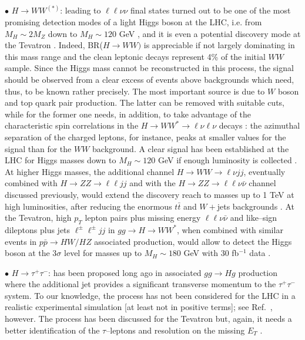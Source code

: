 $\bullet$ \underline{$H \to WW^{(*)}$}: leading to $ \ell \ell \nu \nu$ final
states turned out to be one of the most promising detection modes of a light
Higgs boson at the LHC, i.e. from $M_H \sim 2M_Z$ down to $M_H \sim 120$ GeV
\cite{pp-HWW-lnln,pp-HWW-lnln2}, and it is even a potential discovery mode at 
the Tevatron \cite{pp-WW-TeV}. Indeed, BR($H \to WW)$ is appreciable if not 
largely dominating in this mass range and the clean leptonic decays represent 
4\% of the initial $WW$ sample. Since the Higgs mass cannot be reconstructed in
this process, the signal should be observed from a clear excess of events above
backgrounds which need, thus, to be known rather precisely. The most important
source is due to $W$ boson \cite{pp-bkg-WW} and top quark \cite{pp-bkg-tt} pair
production. The latter can be removed with suitable cuts, while for the former
one needs, in addition, to take advantage of the characteristic spin
correlations in the $H \to WW^* \to \ell \nu \ell \nu$ decays
\cite{CPHVVpol,pp-HWW-lnln}: the azimuthal separation of the charged
leptons, for instance, peaks at smaller values for the signal than for the $WW$
background.  A clear signal has been established at the LHC for Higgs masses 
down to $M_H \sim 120$ GeV if enough luminosity is collected
\cite{pp-HWW-lnln,pp-HWW-lnln2}.  At higher Higgs masses, the additional channel
$H\to WW\to \ell\nu jj$, eventually combined with $H\to ZZ\to \ell\ell jj$ and 
with the $H\to ZZ\to \ell \ell\nu \bar \nu$ channel discussed previously, would
extend the discovery reach to masses up to 1 TeV at high luminosities, after
reducing the enormous $t\bar t$ and $W+$jets backgrounds \cite{H-WW-lnjj-high}.
At the Tevatron, high $p_T$ lepton pairs plus missing energy $\ell \ell \nu
\bar \nu$ and like--sign dileptons plus jets $\ell^\pm \ell^\pm jj$ in $gg \to
H\to WW^*$, when combined with similar events in $p\bar p \to HW/HZ$ associated
production, would allow to detect the Higgs boson at the $3\sigma$ level for
masses up to $M_H \sim 180$ GeV with 30 fb$^{-1}$ data \cite{pp-WW-TeV}.\s 

$\bullet$ \underline{$H \to \tau^+ \tau^-$}: has been proposed long ago
\cite{pp-ggH-tau-old,pp-Hgg-PT} in associated $gg \to Hg$ production
where the additional jet provides a significant transverse momentum to the
$\tau^+\tau^-$ system.  To our knowledge, the process has not been considered
for the LHC in a realistic experimental simulation [at least not in positive
terms]; see Ref.~\cite{pp-ggH-tau}, however. The process has been discussed for
the Tevatron \cite{pp-tau-TeV} but, again, it needs a better identification of 
the $\tau$--leptons and resolution on the missing $E_T$ \cite{Higgs-TeV}.\s

